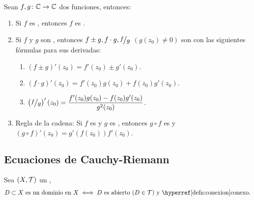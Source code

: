 \begin{prop}\label{prop:fn-compleja-derivable}\mbox{}\\
    Sean $f, g \colon \mathbb{C} \to \mathbb{C}$ dos funciones, entonces:
    \begin{enumerate}
        \item Si $f$ es , entonces $f$ es .
        \item Si $f$ y $g$ son , entonces $f\pm g, f\cdot g, \sfrac{f}{g}$ $\left(g(z_0)\neq 0\right)$ son  con las siguientes fórmulas para sus derivadas:
        \begin{enumerate}[label=\textnormal{(\alph*)}]
            \item $\left(f\pm g\right)'(z_0) = f'(z_0) \pm g'(z_0)$.
            \item $\left(f\cdot g\right)'(z_0) = f'(z_0)g(z_0) + f(z_0)g'(z_0)$.
            \item $\ds \left(\sfrac{f}{g}\right)'(z_0) = \frac{f'(z_0)g(z_0) - f(z_0)g'(z_0)}{g^2(z_0)}$.
        \end{enumerate}
        \item Regla de la cadena: Si $f$ es  y $g$ es , entonces $g\circ f$ es  y $\left(g\circ f\right)'(z_0) = g'\left(f(z_0)\right)f'(z_0)$.
    \end{enumerate}
\end{prop}

\subsection{Ecuaciones de Cauchy-Riemann}

\begin{defn}[Dominio]\label{defn:dominio}
    Sea $\left(X, \mathcal{T}\right)$ un ,
    \[D \subset X \tex{ es un dominio en }X \iff D \tex{ es abierto ($D \in \T$) y \exhyperref[defn:conexion]{conexion}{conexo}}.\]
\end{defn}

